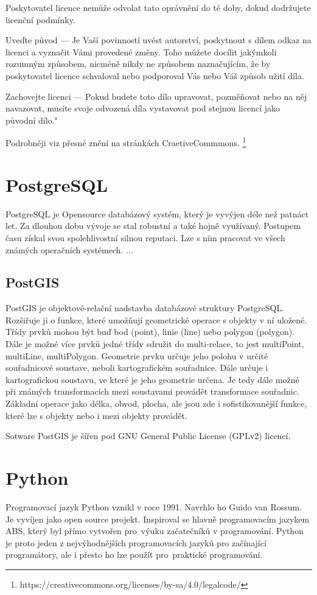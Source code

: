 Poskytovatel licence nemůže odvolat tato oprávnění do té doby, dokud dodržujete licenční podmínky.

Uveďte původ — Je Vaší povinností uvést autorství, poskytnout s dílem odkaz na licenci a vyznačit Vámi provedené změny. Toho můžete docílit jakýmkoli rozumným způsobem, nicméně nikdy ne způsobem naznačujícím, že by poskytovatel licence schvaloval nebo podporoval Vás nebo Váš způsob užití díla.

Zachovejte licenci — Pokud budete toto dílo upravovat, pozměňovat nebo na něj navazovat, musíte svoje odvozená díla vystavovat pod stejnou licencí jako původní dílo."

Podrobněji viz přesné znění na stránkách CraetiveCommmons.
\footnote{https://creativecommons.org/licenses/by-sa/4.0/legalcode/}


\section{PostgreSQL}
\label{PostgreSQL}
PostgreSQL je Opensource databázový systém, který je vyvýjen déle než patnáct
let. Za dlouhou dobu vývoje se stal robustní a také hojně využívaný.
Postupem času získal svou spolehlivostní silnou reputaci.
Lze s ním pracovat ve všech známých operačních systémech. 
...
\cite{PostgreSQL}

\subsection{PostGIS}
\label{PostGIS}
PostGIS je objektově-relační nadstavba databázové struktury PostgreSQL.
Rozšiřuje ji o funkce, které umožňují geometrické operace s objekty v ní uložené.
Třídy prvků mohou být buď bod (point), linie (line) nebo polygon (polygon).
Dále je možné více prvků jedné třídy sdružit do multi-relace, 
to jest  multiPoint, multiLine, multiPolygon.
Geometrie prvku určuje jeho polohu v určité souřadnicové soustave, neboli 
kartografickém souřadnice. Dále určuje i kartografickou soustavu, ve které je 
jeho geometrie určena. Je tedy dále možné při známých transformacích mezi
soustavami provádět transformace souřadnic. Základní operace jako délka, obvod,
plocha, ale jsou zde i sofistikovanější funkce, které lze s objekty nebo i mezi 
objekty provádět.

Sotware PostGIS je šířen pod GNU General Public License (GPLv2) licencí.


\section{Python}
\label{Python}
Programovací jazyk Python vznikl v roce 1991. Navrhlo ho Guido van Rossum. 
Je vyvíjen jako open source projekt. Inspiroval se hlavně programovacím jazykem
ABS, který byl přímo vytvořen pro~výuku začatečníků v programování. Python je 
proto jeden z nejvýhodnějších programovacích jazyků pro začínající programátory,
ale i přesto ho lze použít pro~praktické programování. 

